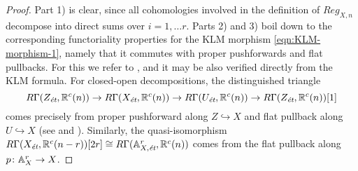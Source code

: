 \documentclass{article}
\numberwithin{equation}{section}
\begin{document}
\begin{lemma}
  \begin{proof}
    Part 1) is clear, since all cohomologies involved in the definition of
    $Reg_{X,n}$ decompose into direct sums over $i = 1,\ldots r$.
    Parts 2) and 3) boil down to the corresponding functoriality properties
    for the KLM morphism \eqref{eqn:KLM-morphism-1}, namely that it commutes
    with proper pushforwards and flat pullbacks. For this we refer to
    \cite[Lemma~3, Lemma~4]{Weisschuh-2017}, and it may be also verified
    directly from the KLM formula. For closed-open decompositions,
    the distinguished triangle
    \[ R\Gamma (Z_\et, \RR^c (n)) \to R\Gamma (X_\et, \RR^c (n)) \to
      R\Gamma (U_\et, \RR^c (n)) \to R\Gamma (Z_\et, \RR^c (n)) [1] \]
    comes precisely from proper pushforward along $Z \hookrightarrow X$ and flat
    pullback along $U \hookrightarrow X$ (see \cite[Corollary~7.2]{Geisser-2010}
    and \cite[\S 3]{Bloch-1986}). Similarly, the quasi-isomorphism
    $R\Gamma (X_\et, \RR^c (n-r)) [2r] \cong R\Gamma (\AA^r_{X,\et}, \RR^c (n))$
    comes from the flat pullback along $p\colon \AA^r_X \to X$.
  \end{proof}
\end{lemma}
\end{document}
